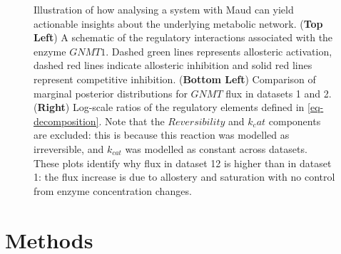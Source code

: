 \documentclass[journal=asbcd6,manuscript=article,layout=traditional]{achemso}
\begin{document}
\begin{figure}

\begin{minipage}[t]{\linewidth}

{\centering 


}

\end{minipage}%

\caption{\label{fig-decomposition}Illustration of how analysing a system
with Maud can yield actionable insights about the underlying metabolic
network. (\textbf{Top Left}) A schematic of the regulatory interactions
associated with the enzyme \(GNMT1\). Dashed green lines represents
allosteric activation, dashed red lines indicate allosteric inhibition
and solid red lines represent competitive inhibition. (\textbf{Bottom
Left}) Comparison of marginal posterior distributions for \(GNMT\) flux
in datasets 1 and 2. (\textbf{Right}) Log-scale ratios of the regulatory
elements defined in \eqref{eq-decomposition}. Note that the
\(Reversibility\) and \(k_cat\) components are excluded: this is because
this reaction was modelled as irreversible, and \(k_{cat}\) was modelled
as constant across datasets. These plots identify why flux in dataset 12
is higher than in dataset 1: the flux increase is due to allostery and
saturation with no control from enzyme concentration changes.}

\end{figure}

\hypertarget{methods}{%
\section{Methods}\label{methods}}
\end{document}
